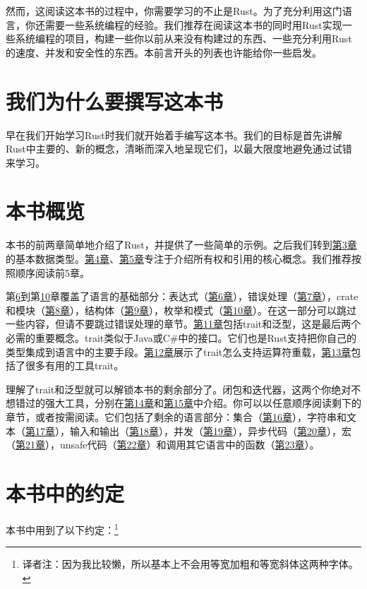 然而，这阅读这本书的过程中，你需要学习的不止是Rust。为了充分利用这门语言，你还需要一些系统编程的经验。我们推荐在阅读这本书的同时用Rust实现一些系统编程的项目，构建一些你以前从来没有构建过的东西、一些充分利用Rust的速度、并发和安全性的东西。本前言开头的列表也许能给你一些启发。

\section*{我们为什么要撰写这本书}
早在我们开始学习Rust时我们就开始着手编写这本书。我们的目标是首先讲解Rust中主要的、新的概念，清晰而深入地呈现它们，以最大限度地避免通过试错来学习。

\section*{本书概览}
本书的前两章简单地介绍了Rust，并提供了一些简单的示例。之后我们转到\hyperref[ch03]{第3章}的基本数据类型。\hyperref[ch04]{第4章}、\hyperref[ch05]{第5章}专注于介绍所有权和引用的核心概念。我们推荐按照顺序阅读前5章。

第\hyperref[ch06]{6}到第\hyperref[ch10]{10}章覆盖了语言的基础部分：表达式（\hyperref[ch06]{第6章}），错误处理（\hyperref[ch07]{第7章}），crate和模块（\hyperref[ch08]{第8章}），结构体（\hyperref[ch09]{第9章}），枚举和模式（\hyperref[ch10]{第10章}）。在这一部分可以跳过一些内容，但请不要跳过错误处理的章节。\hyperref[ch11]{第11章}包括trait和泛型，这是最后两个必需的重要概念。trait类似于Java或C\#中的接口。它们也是Rust支持把你自己的类型集成到语言中的主要手段。\hyperref[ch12]{第12章}展示了trait怎么支持运算符重载，\hyperref[ch13]{第13章}包括了很多有用的工具trait。

理解了trait和泛型就可以解锁本书的剩余部分了。闭包和迭代器，这两个你绝对不想错过的强大工具，分别在\hyperref[ch14]{第14章}和\hyperref[ch15]{第15章}中介绍。你可以以任意顺序阅读剩下的章节，或者按需阅读。它们包括了剩余的语言部分：集合（\hyperref[ch16]{第16章}），字符串和文本（\hyperref[ch17]{第17章}），输入和输出（\hyperref[ch18]{第18章}），并发（\hyperref[ch19]{第19章}），异步代码（\hyperref[ch20]{第20章}），宏（\hyperref[ch21]{第21章}），unsafe代码（\hyperref[ch22]{第22章}）和调用其它语言中的函数（\hyperref[ch23]{第23章}）。

\section*{本书中的约定}
本书中用到了以下约定：\footnote{译者注：因为我比较懒，所以基本上不会用等宽加粗和等宽斜体这两种字体。}

